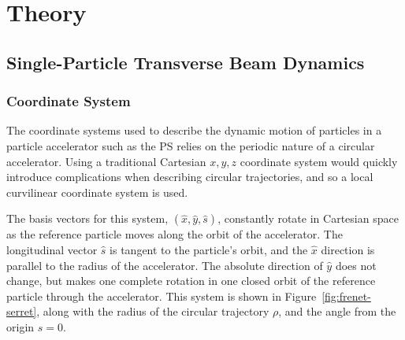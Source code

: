 \documentclass[11pt]{report}
\begin{document}
\chapter{Theory}

\section{Single-Particle Transverse Beam Dynamics}

\subsection{Coordinate System}

The coordinate systems used to describe the dynamic motion of particles in a particle accelerator such as the PS relies on the periodic nature of a circular accelerator. Using a traditional Cartesian $x, y, z$ coordinate system would quickly introduce complications when describing circular trajectories, and so a local curvilinear coordinate system is used.

The basis vectors for this system, $(\hat x, \hat y, \hat s)$, constantly rotate in Cartesian space as the reference particle moves along the orbit of the accelerator. The longitudinal vector $\hat s$ is tangent to the particle's orbit, and the $\hat x$ direction is parallel to the radius of the accelerator. The absolute direction of $\hat y$ does not change, but makes one complete rotation in one closed orbit of the reference particle through the accelerator. This system is shown in Figure~\ref{fig:frenet-serret}, along with the radius of the circular trajectory $\rho$, and the angle from the origin $s=0$. 
\end{document}
